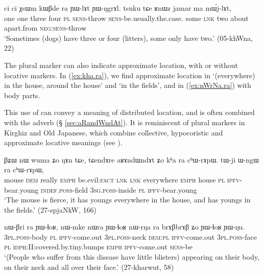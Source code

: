 \begin{exe}
\ex \label{ex:XsWm.kWBde}
\gll ci ci χsɯm kɯβde ra ɲɯ-lɤt ɲɯ-ŋgrɤl. tsuku tɕe ʁnɯz jamar ma mɯ́j-lɤt,\\
one one three four \textsc{pl} \textsc{sens}-throw \textsc{sens}-be.usually.the.case. some \textsc{lnk} two about apart.from \textsc{neg}:\textsc{sens}-throw \\
\glt  `Sometimes (dogs) have three or four (litters), some only have two.' (05-khWna, 22)
\end{exe} 

The plural marker  can also indicate approximate location, with or without locative markers. In (\ref{ex:kha.ra}), we find approximate location  in  `(everywhere) in the house, around the house' and  `in the fields', and in (\ref{ex:nWrNa.ra}) with body parts.

This use of  can convey a meaning of distributed location, and is often combined with the adverb  (§ \ref{sec:aRandWndAt}). It is reminiscent of plural markers in Kirghiz and Old Japanese, which combine collective, hypocoristic and approximate locative meanings (see \citealt[195]{antonov07ra}).

\begin{exe}
\ex \label{ex:kha.ra}
\gll βʑɯ nɯ wuma ʑo ŋɤn tɕe, tɕendɤre aʁɤndɯndɤt ʑo kʰa ra cʰɯ-rɤpɯ. tɯ-ji ɯ-ngɯ ra cʰɯ-rɤpɯ, \\
mouse \textsc{dem} really \textsc{emph} be.evil:\textsc{fact} \textsc{lnk} \textsc{lnk} everywhere \textsc{emph} house \textsc{pl} \textsc{ipfv}-bear.young \textsc{indef}.\textsc{poss}-field \textsc{3sg}.\textsc{poss}-inside \textsc{pl}  \textsc{ipfv}-bear.young \\
\glt `The mouse is fierce, it has youngs everywhere in the house, and has youngs in the fields.' (27-spjaNkW, 166)
\end{exe} 

\begin{exe}
\ex \label{ex:nWrNa.ra}
\gll nɯ-βri ra ɲɯ-ɬoʁ, nɯ-mke nɯra ɲɯ-ɬoʁ nɯ-rŋa ra brɤβbrɤβ ʑo ɲɯ-ɬoʁ ɲɯ-ŋu. \\
\textsc{3pl}.\textsc{poss}-body \textsc{pl} \textsc{ipfv}-come.out \textsc{3pl}.\textsc{poss}-neck \textsc{dem:pl} \textsc{ipfv}-come.out \textsc{3pl}.\textsc{poss}-face \textsc{pl} \textsc{idph}:II:covered.by.tiny.bumps \textsc{emph} \textsc{ipfv}-come.out  \textsc{sens}-be \\
\glt `(People who suffer from this disease have little blisters) appearing on their body, on their neck and all over their face.' (27-kharwut, 58)
\end{exe} 

